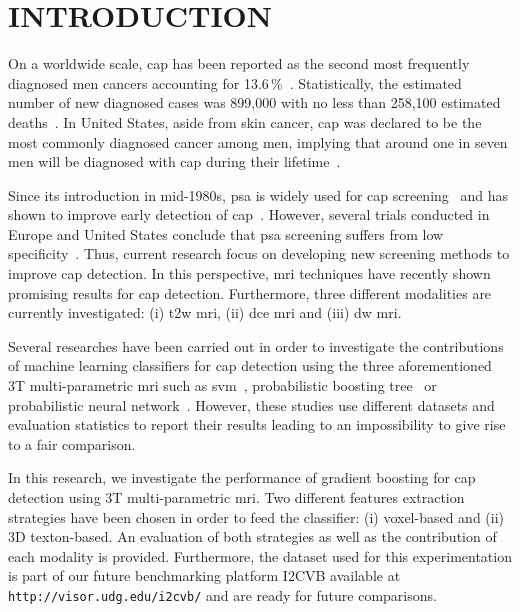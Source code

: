 \section{INTRODUCTION}\label{sec:introduction}

On a worldwide scale, \ac{cap} has been reported as the second most frequently diagnosed men cancers accounting for 13.6\,\%~\cite{Ferlay2010}. Statistically, the estimated number of new diagnosed cases was 899,000 with no less than 258,100 estimated deaths~\cite{Ferlay2010}. In United States, aside from skin cancer, \ac{cap} was declared to be the most commonly diagnosed cancer among men, implying that around one in seven men will be diagnosed with \ac{cap} during their lifetime~\cite{Siegel2014}.

Since its introduction in mid-1980s, \ac{psa} is widely used for \ac{cap} screening~\cite{Etzioni2002} and has shown to improve early detection of \ac{cap}~\cite{Chou2011}. However, several trials conducted in Europe and United States conclude that \ac{psa} screening suffers from low specificity~\cite{Andriole2009,Hugosson2010,Schroeder2012}. Thus, current research focus on developing new screening methods to improve \ac{cap} detection. In this perspective, \Ac{mri} techniques have recently shown promising results for \ac{cap} detection. Furthermore, three different modalities are currently investigated: (i) \ac{t2w} \ac{mri}, (ii) \ac{dce} \ac{mri} and (iii) \ac{dw} \ac{mri}.

Several researches have been carried out in order to investigate the contributions of machine learning classifiers for \ac{cap} detection using the three aforementioned 3T multi-parametric \ac{mri} such as \ac{svm}~\cite{Litjens2011,Litjens2012a,Litjens2014,Liu2013,Peng2013}, probabilistic boosting tree~\cite{Viswanath2011} or probabilistic neural network~\cite{Viswanath2011}. However, these studies use different datasets and evaluation statistics to report their results leading to an impossibility to give rise to a fair comparison.

In this research, we investigate the performance of gradient boosting for \ac{cap} detection using 3T multi-parametric \ac{mri}. Two different features extraction strategies have been chosen in order to feed the classifier: (i) voxel-based and (ii) 3D texton-based. An evaluation of both strategies as well as the contribution of each modality is provided. Furthermore, the dataset used for this experimentation is part of our future benchmarking platform I2CVB available at {\tt http://visor.udg.edu/i2cvb/} and are ready for future comparisons.

